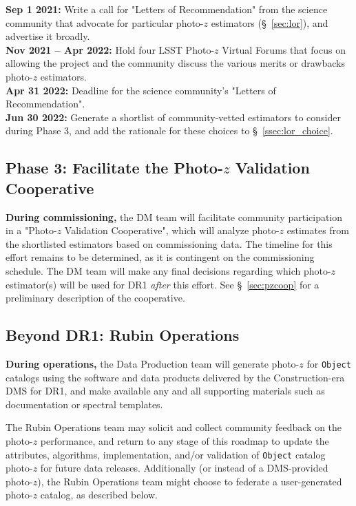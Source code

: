 \documentclass[DM,lsstdraft,toc]{lsstdoc}
\begin{document}
{\bf Sep 1 2021:} Write a call for "Letters of Recommendation" from the science community that advocate for particular photo-$z$ estimators (\S~\ref{sec:lor}), and advertise it broadly. \\
{\bf Nov 2021 -- Apr 2022:} Hold four LSST Photo-$z$ Virtual Forums that focus on allowing the project and the community discuss the various merits or drawbacks photo-$z$ estimators. \\
{\bf Apr 31 2022:} Deadline for the science community's "Letters of Recommendation".\\
{\bf Jun 30 2022:} Generate a shortlist of community-vetted estimators to consider during Phase 3, and add the rationale for these choices to \S~\ref{ssec:lor_choice}.

\subsection{Phase 3: Facilitate the Photo-$z$ Validation Cooperative}\label{ssec:time_pzcoop}

{\bf During commissioning,} the DM team will facilitate community participation in a "Photo-$z$ Validation Cooperative", which will analyze photo-$z$ estimates from the shortlisted estimators based on commissioning data.
The timeline for this effort remains to be determined, as it is contingent on the commissioning schedule.
The DM team will make any final decisions regarding which photo-$z$ estimator(s) will be used for DR1 {\it after} this effort.
See \S~\ref{sec:pzcoop} for a preliminary description of the cooperative.


\subsection{Beyond DR1: Rubin Operations}\label{ssec:time_ops}

{\bf During operations,} the Data Production team will generate photo-$z$ for {\tt Object} catalogs using the software and data products delivered by the Construction-era DMS for DR1, and make available any and all supporting materials such as documentation or spectral templates.

The Rubin Operations team may solicit and collect community feedback on the photo-$z$ performance, and return to any stage of this roadmap to update the attributes, algorithms, implementation, and/or validation of {\tt Object} catalog photo-$z$ for future data releases.
Additionally (or instead of a DMS-provided photo-$z$), the Rubin Operations team might choose to federate a user-generated photo-$z$ catalog, as described below.
\end{document}
